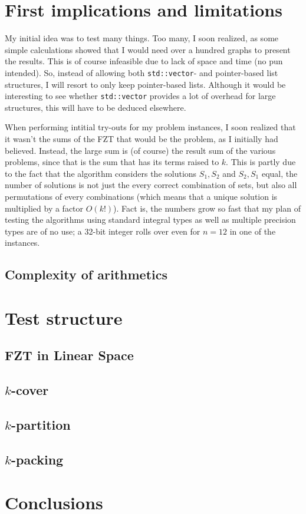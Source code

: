 \documentclass[a4paper, titlepage]{article}
\newcommand{\code}{\texttt}
\begin{document}
\section{First implications and limitations}
My initial idea was to test many things. Too many, I soon realized, as some simple calculations showed that I would need over a hundred graphs to present the results. This is of course infeasible due to lack of space and time (no pun intended). So, instead of allowing both \code{std::vector}- and pointer-based list structures, I will resort to only keep pointer-based lists. Although it would be interesting to see whether \code{std::vector} provides a lot of overhead for large structures, this will have to be deduced elsewhere.

When performing intitial try-outs for my problem instances, I soon realized that it wasn't the sums of the FZT that would be the problem, as I initially had believed. Instead, the large sum is (of course) the result sum of the various problems, since that is the sum that has its terms raised to $k$. This is partly due to the fact that the algorithm considers the solutions $S_1, S_2$ and $S_2, S_1$ equal, the number of solutions is not just the every correct combination of sets, but also all permutations of every combinations (which means that a unique solution is multiplied by a factor $O(k!)$). Fact is, the numbers grow so fast that my plan of testing the algorithms using standard integral types as well as multiple precision types are of no use; a 32-bit integer rolls over even for $n=12$ in one of the instances. 

\subsection{Complexity of arithmetics}

\section{Test structure}

\subsection{FZT in Linear Space}

\subsection{$k$-cover}

\subsection{$k$-partition}

\subsection{$k$-packing}

\section{Conclusions}
\end{document}
